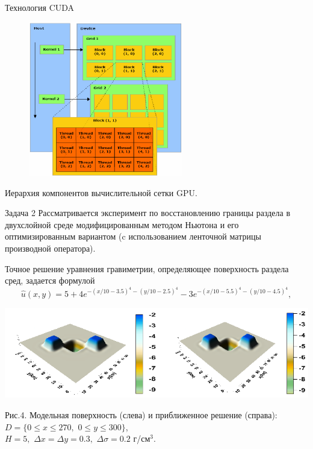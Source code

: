 \documentclass[10pt,pdf, mathserif, hyperref={unicode}]{beamer}
\begin{document}
\begin{frame}{Технология CUDA}
	\begin{figure}[h]
		\centering
		\includegraphics[width=0.6\textwidth]{cuda}
	\end{figure}
	\centering
	Иерархия компонентов вычислительной сетки GPU.
\end{frame}
\begin{frame}{Задача 2}
	Рассматривается эксперимент по восстановлению границы раздела в двухслойной среде модифицированным методом Ньютона и его оптимизированным вариантом (c использованием ленточной матрицы производной оператора).
	
	Точное решение уравнения гравиметрии, определяющее поверхность раздела сред, задается формулой
	$$\hat{u}(x,y)=5+4e^{-(x/10-3.5)^4-(y/10-2.5)^4}-3e^{-(x/10-5.5)^4-(y/10-4.5)^4},$$
	\centering
		
	\includegraphics[width=\textwidth, height=0.35\textheight]{gravy_kiev2014.png}
	
	Рис.4. Модельная поверхность (слева) и приближенное решение (справа): $D=\{0\le x\le 270, \,\,0\le y\le 300\}$, \\ $  H=5,\,\,\Delta x=\Delta y=0.3,\,\,\Delta\sigma=0.2$ г/см$^3$.
\end{frame}
\end{document}
